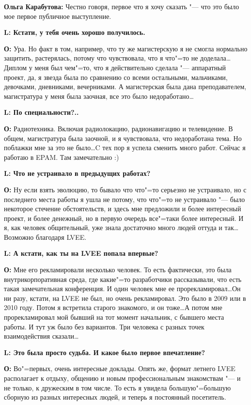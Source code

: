 \documentclass[10pt, a5paper]{article}
\begin{document}
{\noindent \bf Ольга Карабутова:} Честно говоря, первое что я хочу сказать "--- что это было мое первое публичное выступление.

{\noindent \bf L: Кстати, у тебя очень хорошо получилось.}

{\noindent \bf О:} Ура. Но факт в том, например, что ту же магистерскую я не смогла нормально защитить, растерялась, потому что чувствовала, что я что"=то не доделала\ldots Диплом у меня был чем"=то, что я действительно сделала "--- аппаратный проект, да, я звезда была по сравнению со всеми остальными, мальчиками, девочками, дневниками, вечерниками. А магистерская была дана преподавателем, магистратура у меня была заочная, все это было недоработано\ldots

{\noindent \bf L: По специальности?..}

{\noindent \bf О:} Радиотехника. Включая радиолокацию, радионавигацию и телевидение. В общем, магистратура была заочной, и я чувствовала, что недоработана тема. Но поблажки мне за это не было\ldots C тех пор я успела сменить много работ. Сейчас я работаю в EPAM. Там замечательно :)

{\noindent \bf L: Что не устраивало в предыдущих работах?}

{\noindent \bf О:} Ну если взять эволюцию, то бывало что что"=то серьезно не устраивало, но с последнего места работы я ушла не потому, что что"=то не устраивало "--- было некоторое стечение обстоятельств, и здесь мне предложили и более интересный проект, и более денежный, но в первую очередь все"=таки более интересный. И я, как человек общительный,  уже знала достаточно много людей оттуда и так\ldots Возможно благодаря LVEE. 

{\noindent \bf L: А кстати, как ты на LVEE попала впервые?}

{\noindent \bf О:} Мне его рекламировали несколько человек.  То есть фактически, это была внутрикорпоративная среда, где какие"=то разработчики рассказывали, что есть такая замечательная конференция. И один человек мне ее прорекламировал\ldots Он ни разу, кстати, на LVEE не был, но очень рекламировал. Это было в 2009 или в 2010 году. Потом я встретила старого знакомого, и он тоже\ldots А потом мне прорекламировал мой бывший на тот момент начальник, с бывшего места работы. И тут уж было без вариантов. Три человека с разных точек взаимодействия сказали\ldots

{\noindent \bf L: Это была просто судьба. И какое было первое впечатление?}

{\noindent \bf О:} Во"=первых, очень интересные доклады. Опять же, формат летнего LVEE располагает к отдыху, общению и новым профессиональным знакомствам "--- и не только, к дружеским в том числе. То есть я увидела большую"=большую сборную из разных интересных людей, и теперь я постоянный посетитель.
\end{document}
